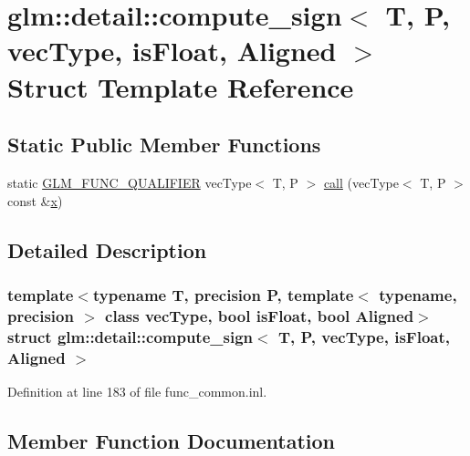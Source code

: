 \hypertarget{structglm_1_1detail_1_1compute__sign}{}\section{glm\+::detail\+::compute\+\_\+sign$<$ T, P, vec\+Type, is\+Float, Aligned $>$ Struct Template Reference}
\label{structglm_1_1detail_1_1compute__sign}
\subsection*{Static Public Member Functions}
\begin{DoxyCompactItemize}
\item 
static \mbox{\hyperlink{setup_8hpp_a33fdea6f91c5f834105f7415e2a64407}{G\+L\+M\+\_\+\+F\+U\+N\+C\+\_\+\+Q\+U\+A\+L\+I\+F\+I\+ER}} vec\+Type$<$ T, P $>$ \mbox{\hyperlink{structglm_1_1detail_1_1compute__sign_a7025aafb1ca04169c5a0930e61a5cdbf}{call}} (vec\+Type$<$ T, P $>$ const \&\mbox{\hyperlink{glad_8h_a92d0386e5c19fb81ea88c9f99644ab1d}{x}})
\end{DoxyCompactItemize}


\subsection{Detailed Description}
\subsubsection*{template$<$typename T, precision P, template$<$ typename, precision $>$ class vec\+Type, bool is\+Float, bool Aligned$>$\newline
struct glm\+::detail\+::compute\+\_\+sign$<$ T, P, vec\+Type, is\+Float, Aligned $>$}



Definition at line 183 of file func\+\_\+common.\+inl.



\subsection{Member Function Documentation}
\mbox{\label{structglm_1_1detail_1_1compute__sign_a7025aafb1ca04169c5a0930e61a5cdbf}} 
